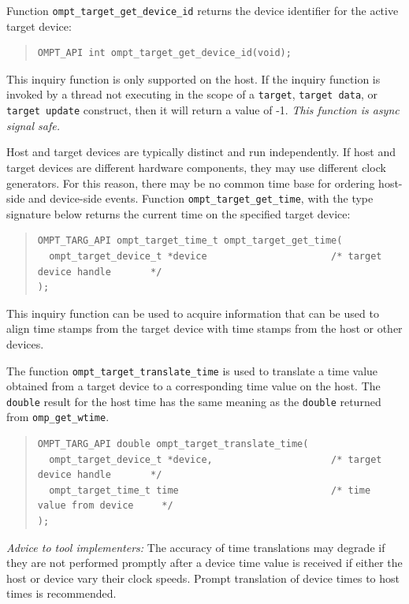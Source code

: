\documentclass{article}
\begin{document}
Function \lstinline|ompt_target_get_device_id| returns the device identifier for the active target device:
\begin{quote}
\begin{lstlisting}
OMPT_API int ompt_target_get_device_id(void);
\end{lstlisting}
\end{quote}
This inquiry function is only supported on the host. If the inquiry function is invoked by a thread not executing in the scope of a {\tt target}, {\tt target data}, or {\tt target update} construct, then it will return a value of -1. {\it This function is async signal safe.}

Host and target devices are typically distinct and run independently. If 
host and target devices are different hardware components, they may 
use different clock generators. For this reason,  there may be no common time base for ordering host-side and device-side events.
Function \lstinline|ompt_target_get_time|, with the type signature below returns the current time on the specified target device:
\begin{quote}
\begin{lstlisting}
OMPT_TARG_API ompt_target_time_t ompt_target_get_time(
  ompt_target_device_t *device                      /* target device handle       */
);
\end{lstlisting}
\end{quote}
This inquiry function can be used
to acquire information that can be used to align time stamps from the target device with time
stamps from the host or other devices.

The function \lstinline|ompt_target_translate_time| is used to translate a time value obtained from a target device to a corresponding time value on the host. The {\tt double} result for the host time has the same meaning as the {\tt double} returned from \lstinline|omp_get_wtime|.
\begin{quote}
\begin{lstlisting}
OMPT_TARG_API double ompt_target_translate_time(
  ompt_target_device_t *device,                     /* target device handle       */
  ompt_target_time_t time                           /* time value from device     */
);
\end{lstlisting}
\end{quote}
\noindent
{\em Advice to tool implementers:} The accuracy of time translations may degrade if they are not performed promptly after a device time value is received if either the host or device vary their clock speeds. Prompt translation of device times to host times is recommended.
\end{document}
